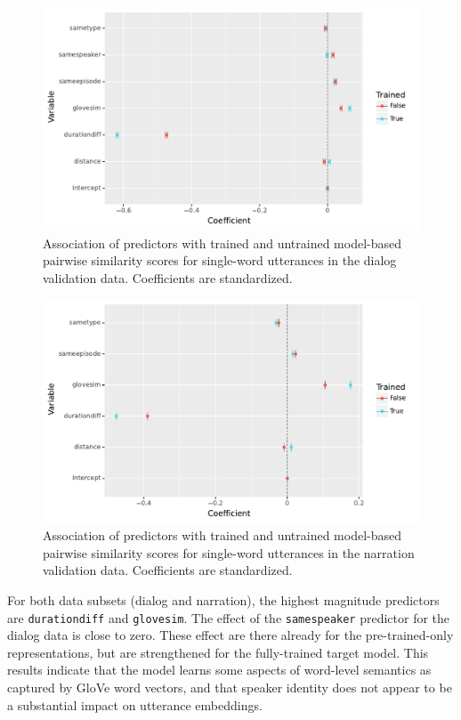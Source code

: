 \begin{figure}
  \centering
  \includegraphics[scale=0.66]{results/grsa_dialog_coef.pdf}
  \caption{Association of predictors with trained and untrained
    model-based pairwise similarity scores for single-word utterances
    in the dialog validation data. Coefficients are standardized.}
  \label{fig:coef_dialog}
\end{figure}

\begin{figure}
  \centering
  \includegraphics[scale=0.66]{results/grsa_narration_coef.pdf}
  \caption{Association of predictors with trained and untrained
    model-based pairwise similarity scores for single-word utterances
    in the narration validation data. Coefficients are standardized.}
  \label{fig:coef_narration}
\end{figure}


For both data subsets (dialog and narration), the highest magnitude
predictors are {\tt durationdiff} and {\tt glovesim}. The effect of
the {\tt samespeaker} predictor for the dialog data is close to zero.
These effect are there already for the pre-trained-only
representations, but are strengthened for the fully-trained target
model.  This results indicate that the model learns some aspects of
word-level semantics as captured by GloVe word vectors, and that
speaker identity does not appear to be a substantial impact on
utterance embeddings.

